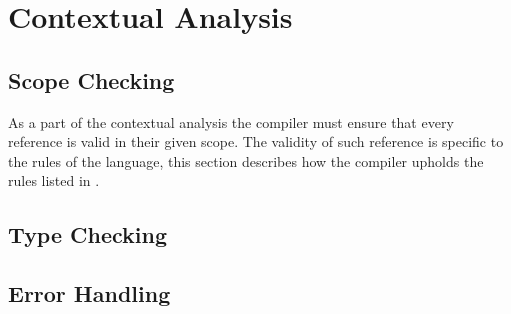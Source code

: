 




\chapter{Contextual Analysis}



\section{Scope Checking}
As a part of the contextual analysis the compiler must ensure that every reference is valid in their given scope.
The validity of such reference is specific to the rules of the language, this section describes how the compiler upholds the rules listed in .


\section{Type Checking}


\section{Error Handling}





